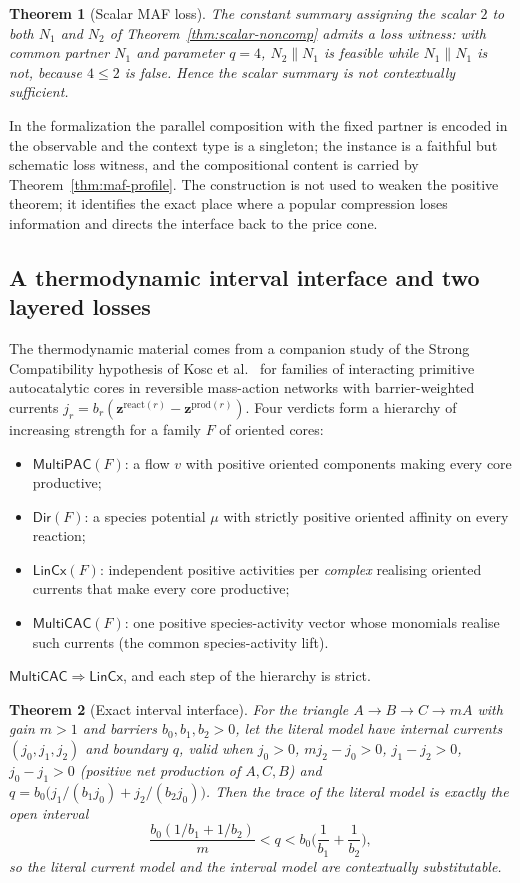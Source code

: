 \documentclass[11pt,a4paper]{article}
\theoremstyle{plain}
\newtheorem{theorem}{Theorem}[section]
\theoremstyle{definition}
\theoremstyle{remark}
\newcommand{\MPAC}{\mathsf{MultiPAC}}
\newcommand{\MCAC}{\mathsf{MultiCAC}}
\newcommand{\DIR}{\mathsf{Dir}}
\newcommand{\LCC}{\mathsf{LinCx}}
\begin{document}
\begin{theorem}[Scalar MAF loss]\label{thm:maf-loss}
The constant summary assigning the scalar $2$ to both $N_1$ and $N_2$ of Theorem~\ref{thm:scalar-noncomp} admits a loss witness: with common partner $N_1$ and parameter $q=4$, $N_2\parallel N_1$ is feasible while $N_1\parallel N_1$ is not, because $4\le 2$ is false. Hence the scalar summary is not contextually sufficient.
\end{theorem}

In the formalization the parallel composition with the fixed partner is encoded in the observable and the context type is a singleton; the instance is a faithful but schematic loss witness, and the compositional content is carried by Theorem~\ref{thm:maf-profile}. The construction is not used to weaken the positive theorem; it identifies the exact place where a popular compression loses information and directs the interface back to the price cone.

\subsection{A thermodynamic interval interface and two layered losses}

The thermodynamic material comes from a companion study \cite{thermocompanion2026} of the Strong Compatibility hypothesis of Kosc et al.~\cite{kosc2025} for families of interacting primitive autocatalytic cores in reversible mass-action networks with barrier-weighted currents $j_r=b_r(\mathbf z^{\mathrm{react}(r)}-\mathbf z^{\mathrm{prod}(r)})$. Four verdicts form a hierarchy of increasing strength for a family $F$ of oriented cores:
\begin{itemize}
\item $\MPAC(F)$: a flow $v$ with positive oriented components making every core productive;
\item $\DIR(F)$: a species potential $\mu$ with strictly positive oriented affinity on every reaction;
\item $\LCC(F)$: independent positive activities per \emph{complex} realising oriented currents that make every core productive;
\item $\MCAC(F)$: one positive species-activity vector whose monomials realise such currents (the common species-activity lift).
\end{itemize}
$\MCAC\Rightarrow\LCC$, and each step of the hierarchy is strict.

\begin{theorem}[Exact interval interface]\label{thm:triangle}
For the triangle $A\to B\to C\to mA$ with gain $m>1$ and barriers $b_0,b_1,b_2>0$, let the literal model have internal currents $(j_0,j_1,j_2)$ and boundary $q$, valid when $j_0>0$, $mj_2-j_0>0$, $j_1-j_2>0$, $j_0-j_1>0$ (positive net production of $A,C,B$) and $q=b_0\big(j_1/(b_1j_0)+j_2/(b_2j_0)\big)$. Then the trace of the literal model is exactly the open interval
\[
\frac{b_0(1/b_1+1/b_2)}{m}<q<b_0\Big(\frac1{b_1}+\frac1{b_2}\Big),
\]
so the literal current model and the interval model are contextually substitutable.
\end{theorem}
\end{document}
